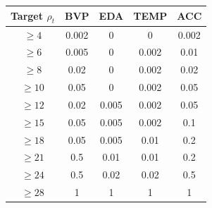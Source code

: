 \begin{tabular}{ccccc}
\toprule
Target $\rho_t$ & BVP & EDA & TEMP & ACC \\
\midrule
$\ge4$ & 0.002 & 0 & 0 & 0.002 \\
$\ge6$ & 0.005 & 0 & 0.002 & 0.01 \\
$\ge8$ & 0.02 & 0 & 0.002 & 0.02 \\
$\ge10$ & 0.05 & 0 & 0.002 & 0.05 \\
$\ge12$ & 0.02 & 0.005 & 0.002 & 0.05 \\
$\ge15$ & 0.05 & 0.005 & 0.002 & 0.1 \\
$\ge18$ & 0.05 & 0.005 & 0.01 & 0.2 \\
$\ge21$ & 0.5 & 0.01 & 0.01 & 0.2 \\
$\ge24$ & 0.5 & 0.02 & 0.02 & 0.5 \\
$\ge28$ & 1 & 1 & 1 & 1 \\
\bottomrule
\end{tabular}
